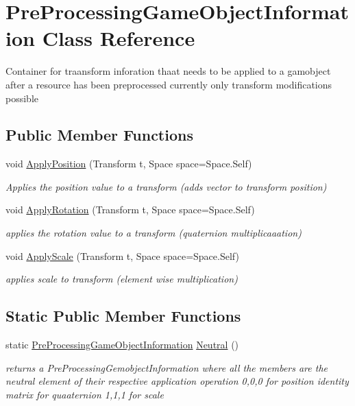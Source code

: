 \hypertarget{class_pre_processing_game_object_information}{}\section{Pre\+Processing\+Game\+Object\+Information Class Reference}
\label{class_pre_processing_game_object_information}


Container for traansform inforation thaat needs to be applied to a gamobject after a resource has been preprocessed currently only transform modifications possible  


\subsection*{Public Member Functions}
\begin{DoxyCompactItemize}
\item 
void \mbox{\hyperlink{class_pre_processing_game_object_information_af58318fffb0f07751dc2472fe7dce7ef}{Apply\+Position}} (Transform t, Space space=Space.\+Self)
\begin{DoxyCompactList}\small\item\em Applies the position value to a transform (adds vector to transform position) \end{DoxyCompactList}\item 
void \mbox{\hyperlink{class_pre_processing_game_object_information_af252abe53894e441edc39890a6196901}{Apply\+Rotation}} (Transform t, Space space=Space.\+Self)
\begin{DoxyCompactList}\small\item\em applies the rotation value to a transform (quaternion multiplicaaation) \end{DoxyCompactList}\item 
void \mbox{\hyperlink{class_pre_processing_game_object_information_ae5ce78a8438afe10ba171442ea863c00}{Apply\+Scale}} (Transform t, Space space=Space.\+Self)
\begin{DoxyCompactList}\small\item\em applies scale to transform (element wise multiplication) \end{DoxyCompactList}\end{DoxyCompactItemize}
\subsection*{Static Public Member Functions}
\begin{DoxyCompactItemize}
\item 
static \mbox{\hyperlink{class_pre_processing_game_object_information}{Pre\+Processing\+Game\+Object\+Information}} \mbox{\hyperlink{class_pre_processing_game_object_information_aec5a374a598a20e933424c6891ed5d99}{Neutral}} ()
\begin{DoxyCompactList}\small\item\em returns a Pre\+Processing\+Gemobject\+Information where all the members are the neutral element of their respective application operation 0,0,0 for position identity matrix for quaaternion 1,1,1 for scale \end{DoxyCompactList}\end{DoxyCompactItemize}

